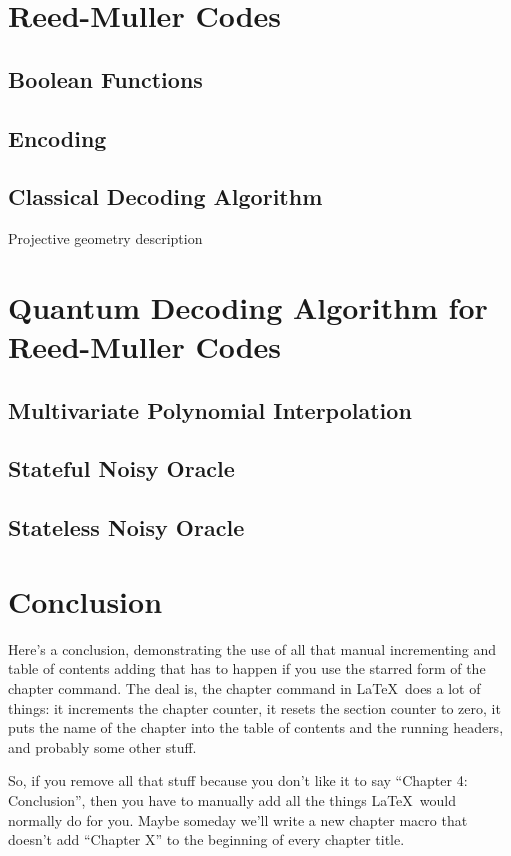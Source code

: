 \documentclass[12pt,twoside]{reedthesis}
\begin{document}
\chapter{Reed-Muller Codes}
\section{Boolean Functions}
\section{Encoding}
\section{Classical Decoding Algorithm}
Projective geometry description


\chapter{Quantum Decoding Algorithm for Reed-Muller Codes}
\section{Multivariate Polynomial Interpolation}
\section{Stateful Noisy Oracle}
\section{Stateless Noisy Oracle}

\chapter*{Conclusion}
	\setcounter{chapter}{6}
	\setcounter{section}{0}
	
Here's a conclusion, demonstrating the use of all that manual incrementing and table of contents adding that has to happen if you use the starred form of the chapter command. The deal is, the chapter command in \LaTeX\ does a lot of things: it increments the chapter counter, it resets the section counter to zero, it puts the name of the chapter into the table of contents and the running headers, and probably some other stuff. 

So, if you remove all that stuff because you don't like it to say ``Chapter 4: Conclusion'', then you have to manually add all the things \LaTeX\ would normally do for you. Maybe someday we'll write a new chapter macro that doesn't add ``Chapter X'' to the beginning of every chapter title.
\end{document}
